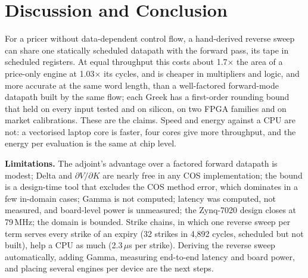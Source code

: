 \documentclass[conference]{IEEEtran}
\begin{document}
\section{Discussion and Conclusion}
\label{sec:discussion}
For a pricer without data-dependent control flow, a hand-derived reverse sweep can share one statically
scheduled datapath with the forward pass, its tape in scheduled registers. At equal throughput this costs
about 1.7$\times$ the area of a price-only engine at 1.03$\times$ its cycles, and is cheaper in multipliers
and logic, and more accurate at the same word length, than a well-factored forward-mode datapath built by
the same flow; each Greek has a first-order rounding bound that held on every input tested and on silicon,
on two FPGA families and on market calibrations. These are the claims. Speed and energy against a CPU are
not: a vectorised laptop core is faster, four cores give more throughput, and the energy per evaluation is
the same at chip level.

\textbf{Limitations.} The adjoint's advantage over a factored forward datapath is modest; Delta and
$\partial V/\partial K$ are nearly free in any COS implementation; the bound is a design-time tool that
excludes the COS method error, which dominates in a few in-domain cases; Gamma is not computed; latency
was computed, not measured, and board-level power is unmeasured; the Zynq-7020 design closes at 79\,MHz;
the domain is bounded. Strike chains, in which one reverse sweep per term serves every strike of an expiry
(32 strikes in 4,892 cycles, scheduled but not built), help a CPU as much (2.3\,$\mu$s per strike).
Deriving the reverse sweep automatically, adding Gamma, measuring end-to-end latency and board power, and
placing several engines per device are the next steps.
\end{document}
